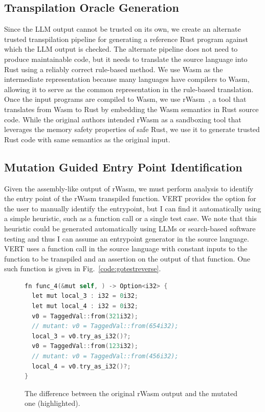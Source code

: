 \documentclass[12pt,openany,oneside,table]{cmuthesis}
\begin{document}
\subsection{Transpilation Oracle Generation}
Since the LLM output cannot be trusted on its own, we create an
alternate trusted transpilation pipeline for generating a reference Rust
program against which the LLM output is checked. The alternate
pipeline does not need to produce maintainable code, but it needs to translate the source language into Rust using a reliably correct rule-based
method. We use Wasm as the intermediate representation because
many languages have compilers to Wasm, allowing it to serve as the
common representation in the rule-based translation. Once the
input programs are compiled to Wasm, we use
rWasm~\cite{bosamiya2022provably}, a tool that translates from Wasm to
Rust by embedding the Wasm semantics in Rust source code. While the
original authors intended rWasm as a sandboxing tool that leverages
the memory safety properties of safe Rust, we use it to generate
trusted Rust code with same semantics as the original input.

\subsection{Mutation Guided Entry Point Identification}
Given the assembly-like output of rWasm, we must perform analysis to
identify the entry point of the rWasm transpiled function. VERT
provides the option for the user to manually identify the entrypoint,
but I can find it automatically using a simple heuristic, such as a function call or a single test case. We note that this heuristic could be generated automatically using LLMs or search-based software testing and thus I can assume an entrypoint generator in the source language. VERT uses a function call in the source language with constant
inputs to the function to be transpiled and an assertion on the output
of that function. One such function is given in Fig.~\ref{code:gotestreverse}.

\begin{figure}
\centering
\begin{lstlisting}[numbersep=5pt,xleftmargin=21pt,numberstyle=\scriptsize,basicstyle=\footnotesize\ttfamily,firstnumber=1, language=C]
fn func_4(&mut self, ) -> Option<i32> {
  let mut local_3 : i32 = 0i32;
  let mut local_4 : i32 = 0i32;
  v0 = TaggedVal::from(321i32);
  // mutant: v0 = TaggedVal::from(654i32);
  local_3 = v0.try_as_i32()?;
  v0 = TaggedVal::from(123i32);
  // mutant: v0 = TaggedVal::from(456i32);
  local_4 = v0.try_as_i32()?;
}
\end{lstlisting}
\vspace*{-2mm}
\caption{\small The difference between the original rWasm output and the
  mutated one (highlighted).}
\label{code:gotestwasm}
\end{figure}
\end{document}
